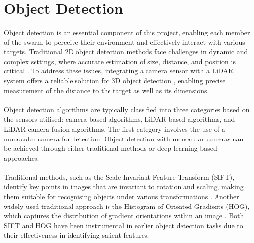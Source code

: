 \section{Object Detection}

\paragraph*{} Object detection is an essential component of this project, enabling each member of the swarm to perceive their environment and effectively interact with various targets. Traditional 2D object detection methods face challenges in dynamic and complex settings, where accurate estimation of size, distance, and position is critical \cite{hybridframework2023}. To address these issues, integrating a camera sensor with a LiDAR system offers a reliable solution for 3D object detection \cite{janai2020}, enabling precise measurement of the distance to the target as well as its dimensions.

\paragraph*{} Object detection algorithms are typically classified into three categories based on the sensors utilised: camera-based algorithms, LiDAR-based algorithms, and LiDAR-camera fusion algorithms. The first category involves the use of a monocular camera for detection. Object detection with monocular cameras can be achieved through either traditional methods or deep learning-based approaches.

\paragraph*{} Traditional methods, such as the Scale-Invariant Feature Transform (SIFT), identify key points in images that are invariant to rotation and scaling, making them suitable for recognising objects under various transformations \cite{lowe2004distinctive}. Another widely used traditional approach is the Histogram of Oriented Gradients (HOG), which captures the distribution of gradient orientations within an image \cite{dalal2005histograms}. Both SIFT and HOG have been instrumental in earlier object detection tasks due to their effectiveness in identifying salient features.

